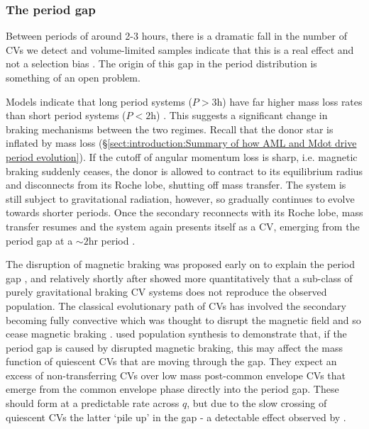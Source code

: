 \subsubsection{The period gap}
\label{sect:introduction:period gap}

Between periods of around 2-3 hours, there is a dramatic fall in the number of CVs we detect and volume-limited samples indicate that this is a real effect and not a selection bias \citep{Kolb1998,pala2020}. The origin of this gap in the period distribution is something of an open problem.

Models indicate that long period systems ($P > 3$h) have far higher mass loss rates than short period systems ($P < 2$h) \citep{ritter1985}. This suggests a significant change in braking mechanisms between the two regimes. 
Recall that the donor star is inflated by mass loss (\S\ref{sect:introduction:Summary of how AML and Mdot drive period evolution}).
If the cutoff of angular momentum loss is sharp, i.e. magnetic braking suddenly ceases, the donor is allowed to contract to its equilibrium radius and disconnects from its Roche lobe, shutting off mass transfer.
The system is still subject to gravitational radiation, however, so gradually continues to evolve towards shorter periods. Once the secondary reconnects with its Roche lobe, mass transfer resumes and the system again presents itself as a CV, emerging from the period gap at a $\sim2$hr period \citep{kolb2002}.

The disruption of magnetic braking was proposed early on to explain the period gap \citep{rappaport1983, spruit1983}, and relatively shortly after \citet{kolb1993} showed more quantitatively that a sub-class of purely gravitational braking CV systems does not reproduce the observed population. 
The classical evolutionary path of CVs has involved the secondary becoming fully convective which was thought to disrupt the magnetic field and so cease magnetic braking \citep{knigge11}.
\citet{Davis2008} used population synthesis to demonstrate that, if the period gap is caused by disrupted magnetic braking, this may affect the mass function of quiescent CVs that are moving through the gap. They expect an excess of non-transferring CVs over low mass post-common envelope CVs that emerge from the common envelope phase directly into the period gap. 
These should form at a predictable rate across $q$, but due to the slow crossing of quiescent CVs the latter `pile up' in the gap - a detectable effect observed by \citet{zorotovic2011}.


